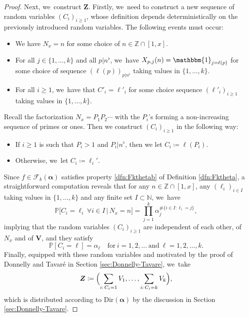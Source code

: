 \documentclass[JEP,XML,SOM,Unicode,published]{cedram}
\newcommand{\bV}{{\boldsymbol V}}
\newcommand{\bZ}{{\boldsymbol Z}}
\newcommand{\NN}{\mathbb{N}}
\newcommand{\ZZ}{\mathbb{Z}}
\newcommand{\PP}{\mathbb{P}}
\newcommand{\boldalpha}{\boldsymbol{\alpha}}
\newcommand{\one}{\mathbbm{1}}
\newcommand{\bg}{\big}
\theoremstyle{plain}
\theoremstyle{definition}
\begin{document}
\begin{proof}
Next, we~construct $\bZ$. Firstly, we~need to construct a new sequence of random variables $(C_i)_{i\ge1}$, whose definition depends deterministically on the previously introduced random variables. The following events must occur:
\begin{itemize}
\item We have $N_x = n$ for some choice of $n \in \ZZ \cap [1, x]$.
\item For all $j \in \{1, \ldots, k\}$ and all $p|n^\flat$, we~have $X_{p, j}(n) = \one_{j=\ell(p)}$ for some choice of sequence $(\ell(p))_{p | n^\flat}$ taking values in $\{1, \ldots, k\}$.
\item For all $i \ge 1$, we~have that $C'_i = \ell'_i$ for some choice sequence $(\ell'_i)_{i \ge 1}$ taking values in $\{1, \ldots, k\}$.
\end{itemize}
Recall the factorization $N_x=P_1P_2\cdots$ with the $P_i$'s forming a non-increasing sequence of primes or ones. Then we construct $(C_i)_{i \ge 1}$ in the following way:
\begin{itemize}
\item If $i\ge1$ is such that $P_i > 1$ and $P_i|n^\flat$, then we let $C_i\coloneqq\ell(P_i)$.
\item Otherwise, we~let $C_i\coloneqq \ell_i'$.
\end{itemize}
Since $f\in\mathcal F_k(\boldalpha)$ satisfies property \eqref{dfn:Fkthetab} of Definition \ref{dfn:Fktheta}, a straightforward computation reveals that for any $n \in \ZZ \cap [1, x]$, any $(\ell_i)_{i \in I}$ taking values in $\{1, \ldots, k\}$ and any finite set $I \subset \NN$, we~have
\[
\PP\bg[C_i = \ell_i \ \forall i \in I\, |\,N_x = n\bg] = \prod_{j=1}^k \alpha_j^{\#\{i \in I : \ell_i = j\}},
\]
implying that the random variables $(C_i)_{i\ge1}$ are independent of each other, of $N_x$ and of $\bV$, and they satisfy
\[
\label{eq:C_i dfn}
\PP[C_i=\ell]=\alpha_\ell\quad\text{for}\ i=1,2,\dots\ \text{and}\ \ell=1,2,\dots,k.
\]
Finally, equipped with these random variables and motivated by the proof of Donnelly and Tavaré in Section \ref{sec:Donnelly-Tavare}, we~take
\[
\bZ \coloneqq \Bigl(\sum_{i:\, C_i=1} V_1, \ldots, \sum_{i:\, C_i=k} V_k \Bigr),
\]
which is distributed according to $\text{Dir}(\boldalpha)$ by the discussion in Section \ref{sec:Donnelly-Tavare}.


\end{proof}
\end{document}
